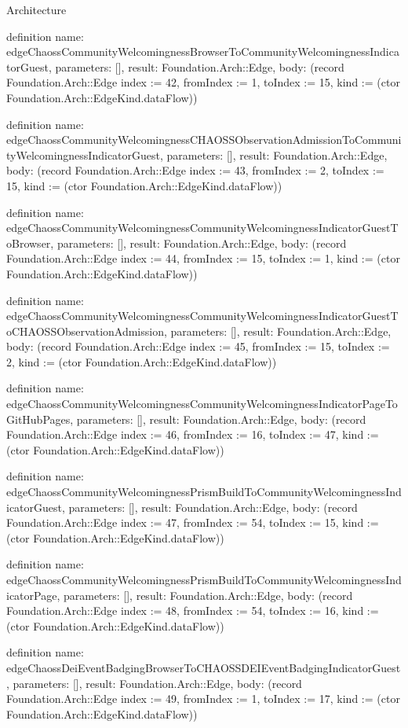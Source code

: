 \begin{lexlean}{Architecture}
\begin{semanticmodule}
definition{
  name: edgeChaossCommunityWelcomingnessBrowserToCommunityWelcomingnessIndicatorGuest,
  parameters: [],
  result: Foundation.Arch::Edge,
  body: (record Foundation.Arch::Edge {index := 42, fromIndex := 1, toIndex := 15, kind := (ctor Foundation.Arch::EdgeKind.dataFlow)})
}

definition{
  name: edgeChaossCommunityWelcomingnessCHAOSSObservationAdmissionToCommunityWelcomingnessIndicatorGuest,
  parameters: [],
  result: Foundation.Arch::Edge,
  body: (record Foundation.Arch::Edge {index := 43, fromIndex := 2, toIndex := 15, kind := (ctor Foundation.Arch::EdgeKind.dataFlow)})
}

definition{
  name: edgeChaossCommunityWelcomingnessCommunityWelcomingnessIndicatorGuestToBrowser,
  parameters: [],
  result: Foundation.Arch::Edge,
  body: (record Foundation.Arch::Edge {index := 44, fromIndex := 15, toIndex := 1, kind := (ctor Foundation.Arch::EdgeKind.dataFlow)})
}

definition{
  name: edgeChaossCommunityWelcomingnessCommunityWelcomingnessIndicatorGuestToCHAOSSObservationAdmission,
  parameters: [],
  result: Foundation.Arch::Edge,
  body: (record Foundation.Arch::Edge {index := 45, fromIndex := 15, toIndex := 2, kind := (ctor Foundation.Arch::EdgeKind.dataFlow)})
}

definition{
  name: edgeChaossCommunityWelcomingnessCommunityWelcomingnessIndicatorPageToGitHubPages,
  parameters: [],
  result: Foundation.Arch::Edge,
  body: (record Foundation.Arch::Edge {index := 46, fromIndex := 16, toIndex := 47, kind := (ctor Foundation.Arch::EdgeKind.dataFlow)})
}

definition{
  name: edgeChaossCommunityWelcomingnessPrismBuildToCommunityWelcomingnessIndicatorGuest,
  parameters: [],
  result: Foundation.Arch::Edge,
  body: (record Foundation.Arch::Edge {index := 47, fromIndex := 54, toIndex := 15, kind := (ctor Foundation.Arch::EdgeKind.dataFlow)})
}

definition{
  name: edgeChaossCommunityWelcomingnessPrismBuildToCommunityWelcomingnessIndicatorPage,
  parameters: [],
  result: Foundation.Arch::Edge,
  body: (record Foundation.Arch::Edge {index := 48, fromIndex := 54, toIndex := 16, kind := (ctor Foundation.Arch::EdgeKind.dataFlow)})
}

definition{
  name: edgeChaossDeiEventBadgingBrowserToCHAOSSDEIEventBadgingIndicatorGuest,
  parameters: [],
  result: Foundation.Arch::Edge,
  body: (record Foundation.Arch::Edge {index := 49, fromIndex := 1, toIndex := 17, kind := (ctor Foundation.Arch::EdgeKind.dataFlow)})
}


\end{semanticmodule}
\end{lexlean}
